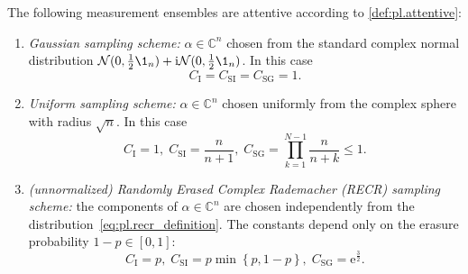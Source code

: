 \begin{proposition}%
  \label{prop:gauss+recr_requirements}
  The following measurement ensembles are attentive according to \cref{def:pl.attentive}:
  \begin{enumerate}
    \item\label{item:gauss+recr_requirements.gaussian} \emph{Gaussian sampling scheme:} $\alpha \in \mathbb{C}^n$ chosen from the standard complex normal distribution $\mathcal{N}(0,\tfrac{1}{2}\1_n) + \ii \mathcal{N}(0,\tfrac{1}{2}\1_n)$.
    In this case
    \[
      C_\mathrm{I} = C_\mathrm{SI} = C_\mathrm{SG} = 1.
    \]

    \item\label{item:gauss+recr_requirements.uniform} \emph{Uniform sampling scheme:} $\alpha \in \mathbb{C}^n$ chosen uniformly from the complex sphere with radius $\sqrt{n}$.
    In this case
    \[
      C_\mathrm{I} = 1, \; C_\mathrm{SI} = \frac{n}{n+1}, \; C_\mathrm{SG} = \prod_{k=1}^{N-1} \frac{n}{n+k} \leq 1.
    \]

    \item\label{item:gauss+recr_requirements.recr} \emph{(unnormalized) Randomly Erased Complex Rademacher (RECR) sampling scheme:} the components of $\alpha \in \mathbb{C}^n$ are chosen independently from the distribution~\eqref{eq:pl.recr_definition}.
    The constants depend only on the erasure probability $1-p \in [0,1]$:
    \[
      C_\mathrm{I} = p,\; C_\mathrm{SI} = p \min \left\{p,1-p \right\}, \; C_\mathrm{SG} = \mathrm{e}^{\frac{3}{2}}.
    \]
  \end{enumerate}
\end{proposition}

